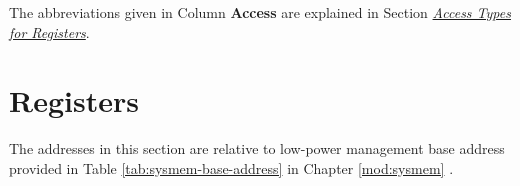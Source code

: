 \documentclass[main\_\_EN.tex]{subfiles}
\begin{document}
The abbreviations given in Column \textbf{Access} are explained in Section \hyperref[glossary-access-types]{\textit{Access Types for Registers}}.




\clearpage
\section{Registers}

The addresses in this section are relative to low-power management base address provided in Table \ref{tab:sysmem-base-address} in Chapter \ref{mod:sysmem} \textit{}.


\end{document}
